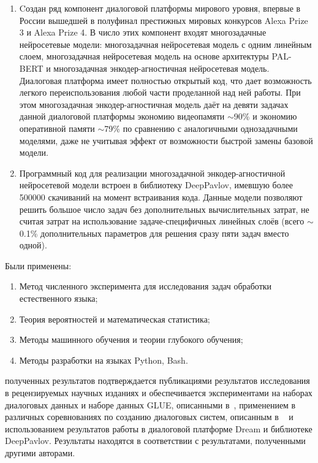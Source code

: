 {\influence}
\begin{enumerate}
   \item Cоздан ряд компонент диалоговой платформы мирового уровня, впервые в России вышедшей в полуфинал престижных мировых конкурсов Alexa Prize 3 и Alexa Prize 4. В число этих компонент входят многозадачные нейросетевые модели: многозадачная нейросетевая модель с одним линейным слоем, многозадачная нейросетевая модель на основе архитектуры PAL-BERT и многозадачная энкодер-агностичная нейросетевая модель. Диалоговая платформа имеет полностью открытый код, что дает возможность легкого переиспользования любой части проделанной над ней работы. При этом многозадачная энкодер-агностичная модель даёт на девяти задачах данной диалоговой платформы экономию видеопамяти $\sim$90\% и экономию оперативной памяти $\sim$79\% по сравнению с аналогичными однозадачными моделями, даже не учитывая эффект от возможности быстрой замены базовой модели.
   \item Программный код для реализации многозадачной энкодер-агностичной нейросетевой модели встроен в библиотеку DeepPavlov, имевшую более 500000 скачиваний на момент встраивания кода. Данные модели позволяют решить большое число задач без дополнительных вычислительных затрат, не считая затрат на использование задаче-специфичных линейных слоёв (всего $\sim$0.1\% дополнительных параметров для решения сразу пяти задач вместо одной).

\end{enumerate}

{\methods}
Были применены: %
\begin{enumerate}
\item Метод численного эксперимента для исследования задач обработки естественного языка;
\item Теория вероятностей и математическая статистика;
\item Методы машинного обучения и теории глубокого обучения;
\item Методы разработки на языках Python, Bash.
\end{enumerate}

{\reliability} полученных результатов подтверждается публикациями результатов исследования в рецензируемых научных изданиях и обеспечивается экспериментами на наборах диалоговых данных и наборе данных GLUE, описанными в~\cite{pseudolabel,rumtl,rutopics}, применением в различных соревнованиях по созданию диалоговых систем, описанным в ~\cite{dream1,dream2,dream1_trudy,Болотин_Карпов_Рашков_Шкурак_2019,mtldream} и использованием результатов работы в диалоговой платформе Dream и библиотеке DeepPavlov.  Результаты находятся в соответствии с результатами, полученными другими авторами.

